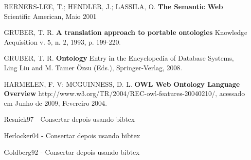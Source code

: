 \begin{thebibliography}{99}

 


  BERNERS-LEE, T.; HENDLER, J.; LASSILA, O.
  \textbf{The Semantic Web}
  Scientific American, Maio 2001
    
   GRUBER, T. R. 
   \textbf{A translation approach to portable ontologies}
   Knowledge Acquisition
   v. 5, n. 2, 1993, p. 199-220.
   
    GRUBER, T. R. 
    \textbf{Ontology}
    Entry in the Encyclopedia of Database Systems, Ling Liu and M. Tamer Özsu (Eds.), Springer-Verlag, 2008.
    
    HARMELEN, F. V; MCGUINNESS, D. L.
    \textbf{OWL Web Ontology Language Overview} 
    http://www.w3.org/TR/2004/REC-owl-features-20040210/, acessado em Junho de 2009, Fevereiro 2004.

    
 Resnick97 - Consertar depois usando bibtex

 Herlocker04 - Consertar depois usando bibtex



 Goldberg92 - Consertar depois usando bibtex



\end{thebibliography}
